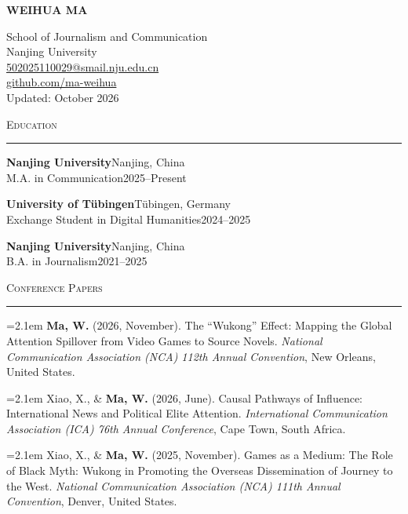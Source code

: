 \documentclass[10pt,letterpaper]{article}
\newcommand{\cvsection}[1]{%
  \par
  \Needspace{4\baselineskip}%
  \vspace{0.66em}%
  {\Large\scshape #1}\par\nobreak
  \vspace{0.28em}%
  \hrule\nobreak
  \vspace{0.40em}%
}
\newcommand{\edu}[4]{%
  \textbf{#1}\hfill #2\\
  #3\hfill #4%
  \par\vspace{0.34em}%
}
\newcommand{\pub}[2]{%
  \par
  \hangindent=2.1em
  \hangafter=1
  \makebox[2.1em][l]{[#1]}#2%
  \par\vspace{0.34em}%
}
\begin{document}

\begin{minipage}[t]{0.55\textwidth}
  {\fontsize{26}{29}\selectfont
   \bfseries\MakeUppercase{Weihua Ma}}
\end{minipage}%
\hfill
\begin{minipage}[t]{0.44\textwidth}
  \raggedleft
  School of Journalism and Communication\\
  Nanjing University\\
  \href{mailto:502025110029@smail.nju.edu.cn}{
    502025110029@smail.nju.edu.cn}\\
  \href{https://github.com/ma-weihua}{
    github.com/ma-weihua}\\
  Updated: October 2026
\end{minipage}


\cvsection{Education}

\edu{Nanjing University}
    {Nanjing, China}
    {M.A. in Communication}
    {2025--Present}

\edu{University of T\"ubingen}
    {T\"ubingen, Germany}
    {Exchange Student in Digital Humanities}
    {2024--2025}

\edu{Nanjing University}
    {Nanjing, China}
    {B.A. in Journalism}
    {2021--2025}


\cvsection{Conference Papers}

\pub{3}{
  \textbf{Ma, W.} (2026, November).
  The ``Wukong'' Effect: Mapping the Global
  Attention Spillover from Video Games to
  Source Novels.
  \textit{National Communication Association
  (NCA) 112th Annual Convention},
  New Orleans, United States.
}

\pub{2}{
  Xiao, X., \& \textbf{Ma, W.} (2026, June).
  Causal Pathways of Influence:
  International News and Political Elite
  Attention.
  \textit{International Communication
  Association (ICA) 76th Annual Conference},
  Cape Town, South Africa.
}

\pub{1}{
  Xiao, X., \& \textbf{Ma, W.} (2025, November).
  Games as a Medium: The Role of Black
  Myth: Wukong in Promoting the Overseas
  Dissemination of Journey to the West.
  \textit{National Communication Association
  (NCA) 111th Annual Convention},
  Denver, United States.
}
\end{document}
